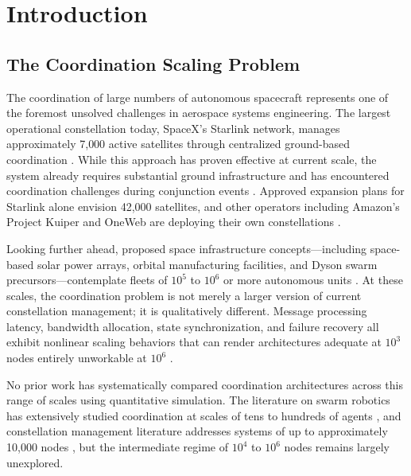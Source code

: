 \documentclass[journal]{IEEEtran}
\begin{document}
\section{Introduction}

\subsection{The Coordination Scaling Problem}

The coordination of large numbers of autonomous spacecraft represents one of the foremost unsolved challenges in aerospace systems engineering. The largest operational constellation today, SpaceX's Starlink network, manages approximately 7{,}000 active satellites through centralized ground-based coordination \cite{starlink_ops}. While this approach has proven effective at current scale, the system already requires substantial ground infrastructure and has encountered coordination challenges during conjunction events \cite{esa_conjunction}. Approved expansion plans for Starlink alone envision 42{,}000 satellites, and other operators including Amazon's Project Kuiper and OneWeb are deploying their own constellations \cite{kuiper, oneweb_mgmt}.

Looking further ahead, proposed space infrastructure concepts---including space-based solar power arrays, orbital manufacturing facilities, and Dyson swarm precursors---contemplate fleets of $10^5$ to $10^6$ or more autonomous units \cite{oneil_1976, badescu_2006}. At these scales, the coordination problem is not merely a larger version of current constellation management; it is qualitatively different. Message processing latency, bandwidth allocation, state synchronization, and failure recovery all exhibit nonlinear scaling behaviors that can render architectures adequate at $10^3$ nodes entirely unworkable at $10^6$ \cite{lynch_distributed}.

No prior work has systematically compared coordination architectures across this range of scales using quantitative simulation. The literature on swarm robotics has extensively studied coordination at scales of tens to hundreds of agents \cite{brambilla_2013}, and constellation management literature addresses systems of up to approximately 10{,}000 nodes \cite{wertz_smad}, but the intermediate regime of $10^4$ to $10^6$ nodes remains largely unexplored.
\end{document}
